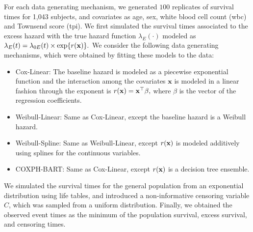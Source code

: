 \documentclass[12pt]{article}
\newcommand{\bfx}{{\bf x}}
\begin{document}
For each data generating mechanism, we generated $100$ replicates of survival times for 1,043 subjects, and covariates as age, sex, white blood cell count (wbc) and Townsend score (tpi). We first simulated the survival times associated to the excess hazard with the true hazard function $\lambda_E(\cdot)$ modeled as 
\begin{math}
  \lambda_E(t) = \lambda_{0E}(t)\times \exp\{r(\bfx)\}.
\end{math}
We consider the following data generating mechanisms, which were obtained by fitting these models to the data:
\begin{itemize}
    \item Cox-Linear: The baseline hazard is modeled as a piecewise exponential function and the interaction among the covariates $\mathbf{x}$ is modeled in a linear fashion through the exponent is $r(\bfx) = \bfx^{\top}\beta,$ where  $\beta$ is the vector of the regression coefficients.
    
    \item Weibull-Linear: Same as Cox-Linear, except the baseline hazard is a Weibull hazard.
    
    \item Weibull-Spline: Same as Weibull-Linear, except $r(\bfx)$ is modeled additively using splines for the continuous variables.
    
    \item COXPH-BART: Same as Cox-Linear, except $r(\bfx)$ is a decision tree ensemble.
\end{itemize}

We simulated the survival times for the general population  from an exponential distribution using life tables, and introduced a non-informative censoring variable $C$, which was sampled from a uniform distribution. Finally, we obtained the observed event times as the minimum of the population survival, excess survival, and censoring times. 
\end{document}
